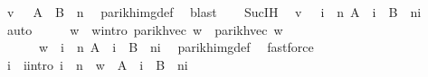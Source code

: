 \begin{isabellebody}
\ {\isachardoublequoteopen}{\isacharquery}{\kern0pt}v{}\ {\isasymin}\ {\isasymPsi}\ {\isacharparenleft}{\kern0pt}{\isacharparenleft}{\kern0pt}A\ {\isasymunion}\ B{\isacharparenright}{\kern0pt}\ {\isacharcircum}{\kern0pt}{\isacharcircum}{\kern0pt}\ n{\isacharparenright}{\kern0pt}{\isachardoublequoteclose}\ \isamarkupfalse%
\ parikh{\isacharunderscore}{\kern0pt}img{\isacharunderscore}{\kern0pt}def\ \isamarkupfalse%
\ blast\isanewline
\ \ \isamarkupfalse%
\ Suc{\isachardot}{\kern0pt}IH\ \isamarkupfalse%
\ {\isachardoublequoteopen}{\isacharquery}{\kern0pt}v{}\ {\isasymin}\ {\isasymPsi}\ {\isacharparenleft}{\kern0pt}{\isasymUnion}i\ {\isasymle}\ n{\isachardot}{\kern0pt}\ A\ {\isacharcircum}{\kern0pt}{\isacharcircum}{\kern0pt}\ i\ {\isacharat}{\kern0pt}{\isacharat}{\kern0pt}\ B\ {\isacharcircum}{\kern0pt}{\isacharcircum}{\kern0pt}\ {\isacharparenleft}{\kern0pt}n{\isacharminus}{\kern0pt}i{\isacharparenright}{\kern0pt}{\isacharparenright}{\kern0pt}{\isachardoublequoteclose}\ \isamarkupfalse%
\ auto\isanewline
\ \ \isamarkupfalse%
\ \isamarkupfalse%
\ w{}{\isacharprime}{\kern0pt}\ \ w{}{\isacharprime}{\kern0pt}{\isacharunderscore}{\kern0pt}intro{\isacharcolon}{\kern0pt}\ {\isachardoublequoteopen}parikh{\isacharunderscore}{\kern0pt}vec\ w{}{\isacharprime}{\kern0pt}\ {\isacharequal}{\kern0pt}\ parikh{\isacharunderscore}{\kern0pt}vec\ w{}\ {\isasymand}\isanewline
\ \ \ \ \ \ w{}{\isacharprime}{\kern0pt}\ {\isasymin}\ {\isacharparenleft}{\kern0pt}{\isasymUnion}i\ {\isasymle}\ n{\isachardot}{\kern0pt}\ A\ {\isacharcircum}{\kern0pt}{\isacharcircum}{\kern0pt}\ i\ {\isacharat}{\kern0pt}{\isacharat}{\kern0pt}\ B\ {\isacharcircum}{\kern0pt}{\isacharcircum}{\kern0pt}\ {\isacharparenleft}{\kern0pt}n{\isacharminus}{\kern0pt}i{\isacharparenright}{\kern0pt}{\isacharparenright}{\kern0pt}{\isachardoublequoteclose}\ \isamarkupfalse%
\ parikh{\isacharunderscore}{\kern0pt}img{\isacharunderscore}{\kern0pt}def\ \isamarkupfalse%
\ fastforce\isanewline
\ \ \isamarkupfalse%
\ \isamarkupfalse%
\ i\ \ i{\isacharunderscore}{\kern0pt}intro{\isacharcolon}{\kern0pt}\ {\isachardoublequoteopen}i\ {\isasymle}\ n\ {\isasymand}\ w{}{\isacharprime}{\kern0pt}\ {\isasymin}\ A\ {\isacharcircum}{\kern0pt}{\isacharcircum}{\kern0pt}\ i\ {\isacharat}{\kern0pt}{\isacharat}{\kern0pt}\ B\ {\isacharcircum}{\kern0pt}{\isacharcircum}{\kern0pt}\ {\isacharparenleft}{\kern0pt}n{\isacharminus}{\kern0pt}i{\isacharparenright}{\kern0pt}{\isachardoublequoteclose}\ \isamarkupfalse%

\end{isabellebody}
